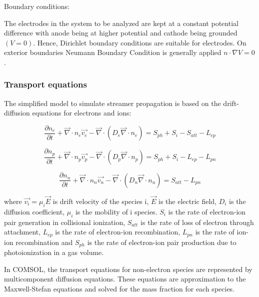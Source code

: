 \documentclass[paper=a4, fontsize=13pt]{scrartcl}
\begin{document}
Boundary conditions:

The electrodes in the system to be analyzed are kept at a constant potential difference with anode being at higher potential and cathode being grounded $(V=0)$. Hence, Dirichlet boundary conditions are suitable for electrodes. On exterior boundaries Neumann Boundary Condition is generally applied $n \cdot \nabla V = 0 $.



\subsubsection{Transport equations}
The simplified model to simulate streamer propagation is based on the drift-diffusion equations for electrons and ions:

\begin{equation} \label{eq:transport e}
\frac{\partial n_e}{\partial t} + \vec{\nabla} \cdot n_e \vec{v_e} -\vec{\nabla} \cdot (D_e \vec{\nabla} \cdot n_e) = S_{ph} + S_i - S_{att} - L_{ep} 
\end{equation}

\begin{equation} \label{eq:transport p}
\frac{\partial n_p}{\partial t} + \vec{\nabla} \cdot n_p \vec{v_p} -\vec{\nabla} \cdot (D_p \vec{\nabla} \cdot n_p) = S_{ph} + S_i - L_{ep} - L_{pn} 
\end{equation}

\begin{equation} \label{eq:transport n}
\frac{\partial n_n}{\partial t} + \vec{\nabla} \cdot n_n \vec{v_n} -\vec{\nabla} \cdot (D_n \vec{\nabla} \cdot n_n) = S_{att} - L_{pn} 
\end{equation}


where $\vec{v_i}= \mu_i \vec{E}$ is drift velocity of the species i, $\vec{E}$ is the electric field, $D_i$ is the diffusion coefficient, $\mu_i$ is the mobility of i species. $S_i$ is the rate of electron-ion pair generation in collisional ionization, $S_{att}$ is the rate of loss of electron through attachment, $L_{ep}$ is the rate of electron-ion recombination, $L_{pn}$ is the rate of ion-ion recombination and $S_{ph}$ is the rate of electron-ion pair production due to photoionization in a gas volume.


In COMSOL, the transport equations for non-electron species are represented by multicomponent diffusion equations. These equations are approximation to the Maxwell-Stefan equations and solved for the mass fraction for each species. 
\end{document}
